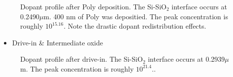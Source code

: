 \documentclass{article}
\begin{document}
\begin{description}[style = nextline]
\begin{figure}[H]
\caption{Dopant profile after Poly deposition. The Si-Si$\text{O}_2$ interface occurs at 0.2490$\mu$m. 400 nm of Poly was depositied. The peak concentration is roughly ${10}^{15.16}$. Note the drastic dopant redistribution effects.}
\label{fig:doping4}
\end{figure}

\begin{itemize}
\item Drive-in \& Intermediate oxide
\end{itemize}
\begin{figure}[H]
\centering
{}
\caption{Dopant profile after drive-in. The Si-Si$\text{O}_2$ interface occurs at 0.2939$\mu$m. The peak concentration is roughly ${10}^{21.4}$..}
\label{fig:doping5}
\end{figure}



\end{description}
\end{document}
